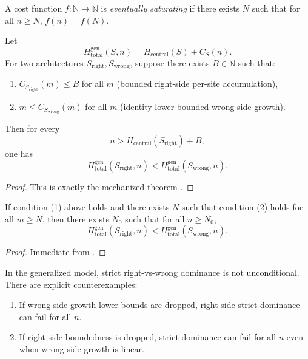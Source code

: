 \begin{definition}\label{def:eventual-saturation}
A cost function $f : \mathbb{N}\to\mathbb{N}$ is \emph{eventually saturating} if there exists $N$ such that for all $n\ge N$, $f(n)=f(N)$.
\end{definition}

\begin{theorem}\label{thm:generalized-dominance}
Let
\[
H_{\text{total}}^{\mathrm{gen}}(S,n)=H_{\text{central}}(S)+C_S(n).
\]
For two architectures $S_{\mathrm{right}},S_{\mathrm{wrong}}$, suppose there exists $B\in\mathbb{N}$ such that:
\begin{enumerate}
\item $C_{S_{\mathrm{right}}}(m)\le B$ for all $m$ (bounded right-side per-site accumulation),
\item $m \le C_{S_{\mathrm{wrong}}}(m)$ for all $m$ (identity-lower-bounded wrong-side growth).
\end{enumerate}
Then for every
\[
n > H_{\text{central}}(S_{\mathrm{right}})+B,
\]
one has
\[
H_{\text{total}}^{\mathrm{gen}}(S_{\mathrm{right}},n)
<
H_{\text{total}}^{\mathrm{gen}}(S_{\mathrm{wrong}},n).
\]
\end{theorem}

\begin{proof}
This is exactly the mechanized theorem
.
\end{proof}

\begin{corollary}\label{cor:generalized-eventual-dominance}
If condition (1) above holds and there exists $N$ such that condition (2) holds for all $m\ge N$, then there exists $N_0$ such that for all $n\ge N_0$,
\[
H_{\text{total}}^{\mathrm{gen}}(S_{\mathrm{right}},n)
<
H_{\text{total}}^{\mathrm{gen}}(S_{\mathrm{wrong}},n).
\]
\end{corollary}

\begin{proof}
Immediate from
.
\end{proof}

\begin{proposition}\label{prop:generalized-assumption-boundary}
In the generalized model, strict right-vs-wrong dominance is not unconditional. There are explicit counterexamples:
\begin{enumerate}
\item If wrong-side growth lower bounds are dropped, right-side strict dominance can fail for all $n$.
\item If right-side boundedness is dropped, strict dominance can fail for all $n$ even when wrong-side growth is linear.
\end{enumerate}
\end{proposition}

